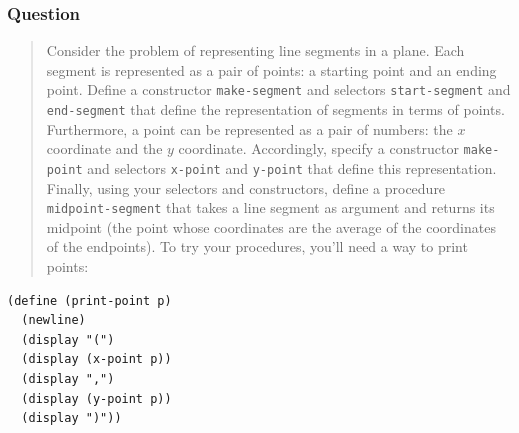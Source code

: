 \documentclass[final,fleqn,titlepage,twoside]{article}
\begin{document}
\subsubsection{Question}
\label{sec:org384d079}
\begin{quote}
Consider the problem of representing line segments in a plane. Each segment is
represented as a pair of points: a starting point and an ending point. Define a
constructor \texttt{make-segment} and selectors \texttt{start-segment} and
\texttt{end-segment} that define the representation of segments in terms of
points. Furthermore, a point can be represented as a pair of numbers: the \(x\)
coordinate and the \(y\) coordinate. Accordingly, specify a constructor
\texttt{make-point} and selectors \texttt{x-point} and \texttt{y-point}
that define this representation. Finally, using your selectors and constructors,
define a procedure \texttt{midpoint-segment} that takes a line segment as
argument and returns its midpoint (the point whose coordinates are the average
of the coordinates of the endpoints). To try your procedures, you'll need a way
to print points:
\end{quote}

\begin{verbatim}
(define (print-point p)
  (newline)
  (display "(")
  (display (x-point p))
  (display ",")
  (display (y-point p))
  (display ")"))
\end{verbatim}
\end{document}
